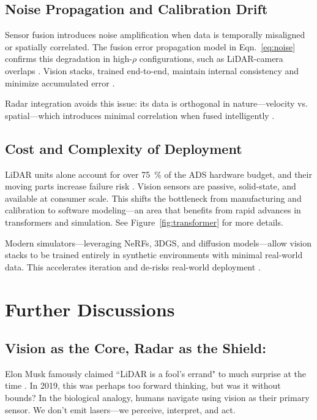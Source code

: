 \documentclass[12pt]{article}
\begin{document}
\subsection{Noise Propagation and Calibration Drift}

Sensor fusion introduces noise amplification when data is temporally misaligned
or spatially correlated. The fusion error propagation model in
Eqn.~\ref{eq:noise} confirms this degradation in high-$\rho$ configurations,
such as LiDAR-camera overlaps \autocite{Rana2023PerceptionSystems}. Vision
stacks, trained end-to-end, maintain internal consistency and minimize
accumulated error \cite{goff2025learningdriveworldmodel}.

Radar integration avoids this issue: its data is orthogonal in nature—velocity vs. spatial—which introduces minimal correlation when fused intelligently \autocite{Liao2024RadarVisionFusion}.

\subsection{Cost and Complexity of Deployment}

LiDAR units alone account for over \SI{75}{\percent} of the ADS hardware budget,
and their moving parts increase failure risk \autocite{Shetty2022LiDARvsCamera,
Sajjad2021ComparativeDetection}. Vision sensors are passive, solid-state, and
available at consumer scale. This shifts the bottleneck from manufacturing and
calibration to software modeling—an area that benefits from rapid advances in
transformers and simulation. See Figure~\ref{fig:transformer} for more details.

Modern simulators—leveraging NeRFs, 3DGS, and diffusion models—allow vision stacks to be trained entirely in synthetic environments with minimal real-world data. This accelerates iteration and de-risks real-world deployment \autocite{Haghighi2024}.

\section{Further Discussions}
\subsection{Vision as the Core, Radar as the Shield:}

Elon Musk famously claimed ``LiDAR is a fool's errand" to much surprise at the
time \cite{TeslaAutonomyDay2019}. In 2019, this was perhaps too forward
thinking, but was it without bounds? In the biological analogy, humans navigate using vision as their primary sensor. We don’t emit lasers—we perceive, interpret, and act.
\end{document}
